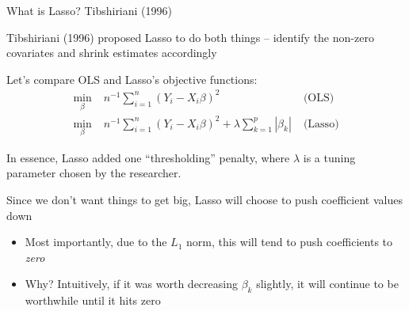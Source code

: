 \documentclass[notes,11pt, aspectratio=169]{beamer}
\newenvironment{wideitemize}{\itemize\addtolength{\itemsep}{10pt}}{\enditemize}
\begin{document}
\begin{frame}{What is Lasso? Tibshiriani (1996)}
  \begin{wideitemize}
  \item Tibshiriani (1996) proposed Lasso to do both things -- identify the
    non-zero covariates and shrink estimates accordingly
  \item Let's compare OLS and Lasso's objective functions:
        \begin{align*}
      \min_{\beta} \; & n^{-1}\sum_{i=1}^{n}(Y_{i} - X_{i}\beta)^{2}   \;& \text{(OLS)}\\
      \min_{\beta} \;& n^{-1}\sum_{i=1}^{n}(Y_{i} - X_{i}\beta)^{2} + \lambda \sum_{k=1}^{p}|\beta_{k}|   \;& \text{(Lasso)}     \end{align*}
  \item In essence, Lasso added one ``thresholding'' penalty, where
    $\lambda$ is a tuning parameter chosen by the researcher.
  \item Since we don't want things to get big, Lasso will choose to push coefficient values down
    \begin{itemize}
    \item Most importantly, due to the $L_{1}$ norm, this will tend to push coefficients to \emph{zero}
    \item Why? Intuitively, if it was worth decreasing $\beta_{k}$
      slightly, it will continue to be worthwhile until it hits zero
    \end{itemize}
  \end{wideitemize}
\end{frame}
\end{document}
